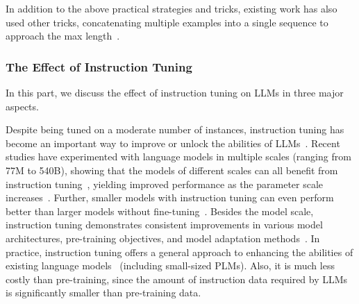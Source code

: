 In addition to the above practical strategies and tricks, existing work has also used other tricks, \eg concatenating multiple examples into a single sequence to approach the max length~\cite{Krell-2021-arxiv-efficient}.



\subsubsection{The Effect of Instruction Tuning}\label{subsec:effectIT}

In this part, we discuss the effect of instruction tuning on LLMs in three major aspects. 


Despite being tuned on a moderate  number of instances, instruction tuning has become an important way to improve or unlock the abilities of LLMs~\cite{Chung-arxiv-2022-Scaling}.  %
Recent studies have experimented with language models in  multiple scales (ranging from  77M to 540B), showing that the models of different scales can all benefit from instruction tuning~\cite{Chung-arxiv-2022-Scaling,Longpre-arxiv-2023-The}, yielding improved performance as the parameter scale  increases~\cite{Muennighoff-2022-arxiv-Crosslingual}.  
Further, smaller models with instruction tuning can even perform better than larger models without fine-tuning~\cite{Sanh-ICLR-2022-Multitask,Chung-arxiv-2022-Scaling}. 
Besides the model scale, instruction tuning demonstrates consistent improvements in various model architectures, pre-training objectives, and model adaptation methods~\cite{Chung-arxiv-2022-Scaling}.
In practice, instruction tuning offers  %
{a general approach to enhancing the abilities of existing language models~\cite{Chung-arxiv-2022-Scaling} (including small-sized PLMs). Also, it is much less costly than pre-training, since the amount of  instruction data required by LLMs is significantly smaller than pre-training data.}   



